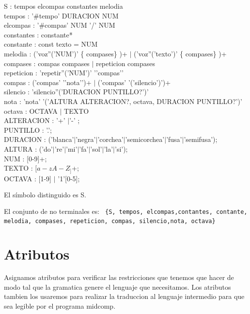 \documentclass[a4paper]{article}
\begin{document}
S : tempos elcompas constantes melodia \\
tempos : '\#tempo' DURACION NUM \\
elcompas :  '\#compas' NUM '/' NUM \\
constantes :  constante* \\
constante :  const texto = NUM \\
melodia :  ('voz''('NUM')' \{ compases\} )+ $|$ ('voz''('texto')' \{ compases\} )+ \\
compases : compas compases $|$ repeticion compases \\
repeticion : 'repetir''('NUM')' '{'compas'}' \\
compas : ('compas' '{'nota'}')+ $|$ ('compas' '('silencio')')+ \\
silencio : 'silencio''('DURACION PUNTILLO?')' \\
nota : 'nota' '('ALTURA ALTERACION?, octava, DURACION PUNTILLO?')' \\
octava : OCTAVA $|$ TEXTO \\
ALTERACION : '+' $|$'-' ; \\
PUNTILLO : '.'; \\
DURACION : ('blanca'$|$'negra'$|$'corchea'$|$'semicorchea'$|$'fusa'$|$'semifusa'); \\
ALTURA : ('do'$|$'re'$|$'mi'$|$'fa'$|$'sol'$|$'la'$|$'si'); \\
NUM : [0-9]+; \\
TEXTO : $[a-zA-Z_]$+; \\
OCTAVA : [1-9] $|$ '1'[0-5]; \linebreak



El símbolo distinguido es S.\linebreak


El conjunto de no terminales es:\linebreak
\texttt{
\{S, tempos, elcompas,contantes, contante, melodia, compases, repeticion, compas, silencio,nota, octava\}  \\
} 

\section{Atributos}

Asignamos atributos para verificar las restricciones que tenemos que hacer de modo tal que la gramatica genere el lenguaje que necesitamos. Los atributos tambien los usaremos
para realizar la traduccion al lenguaje intermedio para que sea legible por el programa midcomp.
\end{document}
